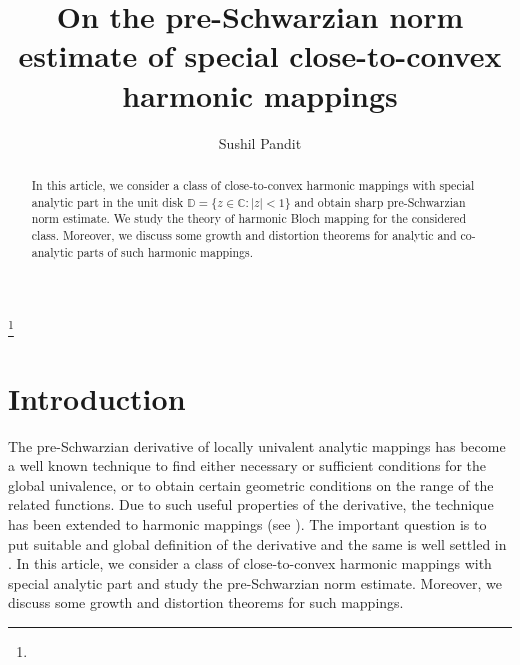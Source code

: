 \documentclass[a4paper,12pt]{amsart}
\theoremstyle{definition}
\newcounter{minutes}\setcounter{minutes}{\time}
\newcounter{hours}\setcounter{hours}{\time}
\newcounter {own}
\begin{document}
	
	\title{On the pre-Schwarzian norm estimate of special close-to-convex harmonic mappings}
	
	
	\author{Sushil Pandit}
	\address{Sushil Pandit,
		Department of Mathematics,
		Government Engineering College Palamu,
		Lesliganj-822118, India, Orcid Id-0000-0002-4129-6456}

	
	
	
	
	
	
	\def\thefootnote{}
	 \makeatletter\def\thefootnote{\@arabic\c@footnote}\makeatother
	
	
	
	\begin{abstract}
		In this article, we consider a class of close-to-convex harmonic mappings with special analytic part in the unit disk $\mathbb{D}=\{z\in\mathbb{C}:|z|<1\}$ and obtain sharp pre-Schwarzian norm estimate. We study the theory of harmonic Bloch mapping for the considered class. Moreover, we discuss some growth and distortion theorems for analytic and co-analytic parts of such harmonic mappings. 
	\end{abstract}
	
	
	
	\thanks{}
	
	\maketitle
	\pagestyle{myheadings}
	
	\section{Introduction}
The pre-Schwarzian derivative of locally univalent analytic mappings has become a well known technique to find either necessary or sufficient conditions for the global univalence, or to obtain certain geometric conditions on the range of the related functions. Due to such useful properties of the derivative, the technique has been extended to harmonic mappings (see \cite{Kanas-Smet-2014, Hernandez-Martin-2015}). The important question is to put suitable and global definition of the derivative and the same is well settled in \cite{ Hernandez-Martin-2015}. In this article, we consider a class of close-to-convex harmonic mappings with special analytic part and study the pre-Schwarzian norm estimate. Moreover, we discuss some growth and distortion theorems for such mappings.\\
\end{document}
